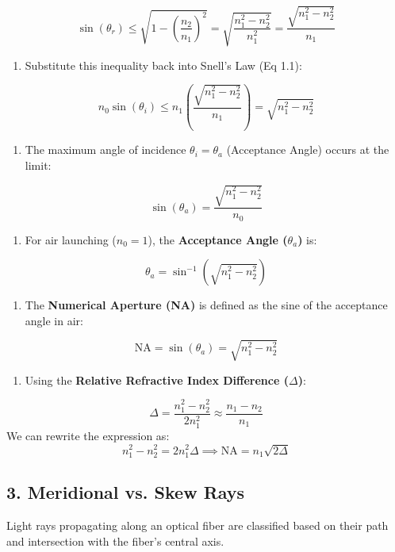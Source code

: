     \[ \sin(\theta_r) \le \sqrt{1 - \left(\frac{n_2}{n_1}\right)^2} = \sqrt{\frac{n_1^2 - n_2^2}{n_1^2}} = \frac{\sqrt{n_1^2 - n_2^2}}{n_1} \]
\begin{enumerate}
  \item Substitute this inequality back into Snell's Law (Eq 1.1):
\end{enumerate}
    \[ n_0 \sin(\theta_i) \le n_1 \left( \frac{\sqrt{n_1^2 - n_2^2}}{n_1} \right) = \sqrt{n_1^2 - n_2^2} \]
\begin{enumerate}
  \item The maximum angle of incidence $\theta_i = \theta_a$ (Acceptance Angle) occurs at the limit:
\end{enumerate}
    \[ \sin(\theta_a) = \frac{\sqrt{n_1^2 - n_2^2}}{n_0} \]
\begin{enumerate}
  \item For air launching ($n_0 = 1$), the \textbf{Acceptance Angle ($\theta_a$)} is:
\end{enumerate}
    \[ \theta_a = \sin^{-1}\left(\sqrt{n_1^2 - n_2^2}\right) \]
\begin{enumerate}
  \item The \textbf{Numerical Aperture (NA)} is defined as the sine of the acceptance angle in air:
\end{enumerate}
    \[ \text{NA} = \sin(\theta_a) = \sqrt{n_1^2 - n_2^2} \]
\begin{enumerate}
  \item Using the \textbf{Relative Refractive Index Difference ($\Delta$)}:
\end{enumerate}
    \[ \Delta = \frac{n_1^2 - n_2^2}{2 n_1^2} \approx \frac{n_1 - n_2}{n_1} \]
    We can rewrite the expression as:
    \[ n_1^2 - n_2^2 = 2 n_1^2 \Delta \implies \text{NA} = n_1 \sqrt{2 \Delta} \]


\subsection{3. Meridional vs. Skew Rays}
Light rays propagating along an optical fiber are classified based on their path and intersection with the fiber's central axis.

